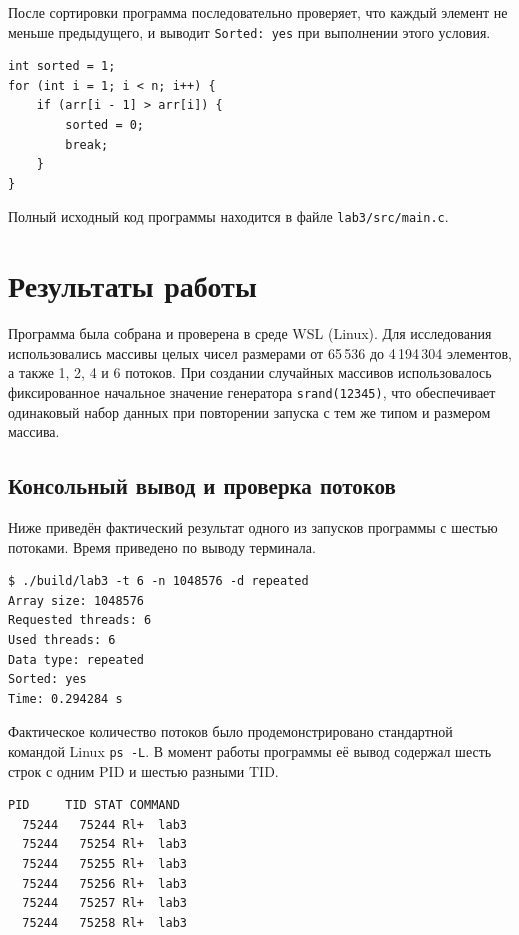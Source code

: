 \documentclass[12pt,a4paper]{article}
\begin{document}
После сортировки программа последовательно проверяет, что каждый элемент не меньше предыдущего, и выводит \texttt{Sorted: yes} при выполнении этого условия.

\begin{lstlisting}[style=cstyle,caption={Проверка порядка элементов после сортировки}]
int sorted = 1;
for (int i = 1; i < n; i++) {
    if (arr[i - 1] > arr[i]) {
        sorted = 0;
        break;
    }
}
\end{lstlisting}

Полный исходный код программы находится в файле \texttt{lab3/src/main.c}.

\Needspace{0.36\textheight}
\section{Результаты работы}
Программа была собрана и проверена в среде WSL (Linux). Для исследования использовались массивы целых чисел размерами от 65\,536 до 4\,194\,304 элементов, а также 1, 2, 4 и 6 потоков. При создании случайных массивов использовалось фиксированное начальное значение генератора \texttt{srand(12345)}, что обеспечивает одинаковый набор данных при повторении запуска с тем же типом и размером массива.

\subsection{Консольный вывод и проверка потоков}
Ниже приведён фактический результат одного из запусков программы с шестью потоками. Время приведено по выводу терминала.

\begin{lstlisting}[style=terminal,caption={Пример успешной сортировки массива}]
$ ./build/lab3 -t 6 -n 1048576 -d repeated
Array size: 1048576
Requested threads: 6
Used threads: 6
Data type: repeated
Sorted: yes
Time: 0.294284 s
\end{lstlisting}

\Needspace{0.28\textheight}
Фактическое количество потоков было продемонстрировано стандартной командой Linux \texttt{ps -L}. В момент работы программы её вывод содержал шесть строк с одним PID и шестью разными TID.

\begin{lstlisting}[style=terminal,caption={Потоки процесса по данным команды ps -L}]
    PID     TID STAT COMMAND
  75244   75244 Rl+  lab3
  75244   75254 Rl+  lab3
  75244   75255 Rl+  lab3
  75244   75256 Rl+  lab3
  75244   75257 Rl+  lab3
  75244   75258 Rl+  lab3
\end{lstlisting}
\end{document}
